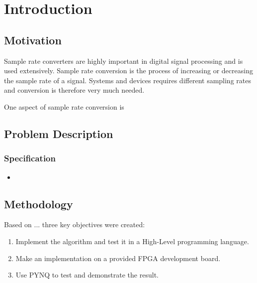 \chapter{Introduction}
\label{chap:introduction}
\section{Motivation} %
Sample rate converters are highly important in digital signal processing and is used extensively. Sample rate conversion is the process of increasing or decreasing the sample rate of a signal. Systems and devices requires different sampling rates and conversion is therefore very much needed. 




One aspect of sample rate conversion is 
%
\section{Problem Description}


\subsection{Specification}

\begin{itemize}
    \item 
\end{itemize}

\section{Methodology}
Based on ... three key objectives were created:
\begin{enumerate}
    \item Implement the algorithm and test it in a High-Level programming language.
    \item Make an implementation on a provided FPGA development board.
    \item Use PYNQ to test and demonstrate the result.
\end{enumerate}


